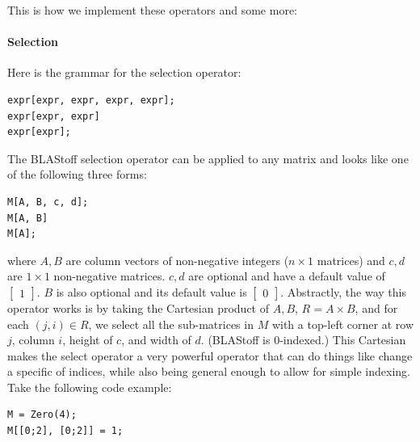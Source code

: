 This is how we implement these operators and some more:

\paragraph{Selection}
Here is the grammar for the selection operator:\begin{lstlisting}
expr[expr, expr, expr, expr];
expr[expr, expr]
expr[expr];
\end{lstlisting}
The BLAStoff selection operator can be applied to any matrix and looks like one of the following three forms:
\begin{lstlisting}
M[A, B, c, d];
M[A, B]
M[A];
\end{lstlisting}
where $A,B$ are column vectors of non-negative integers ($n\times 1$ matrices) and $c,d$ are $1 \times 1$ non-negative matrices.  $c,d$ are optional and have a default value of $\begin{bmatrix}1\end{bmatrix}$. $B$ is also optional and its default value is $\begin{bmatrix}0\end{bmatrix}$.  Abstractly, the way this operator works is by taking the Cartesian product of $A,B$, $R=A\times B$, and for each $(j,i)\in R$, we select all the sub-matrices in $M$ with a top-left corner at row $j$, column $i$, height of $c$, and width of $d$.  (BLAStoff is 0-indexed.)  This Cartesian makes the select operator a very powerful operator that can do things like change a specific of indices, while also being general enough to allow for simple indexing.  Take the following code example:
\begin{lstlisting}
M = Zero(4);
M[[0;2], [0;2]] = 1;
\end{lstlisting}

